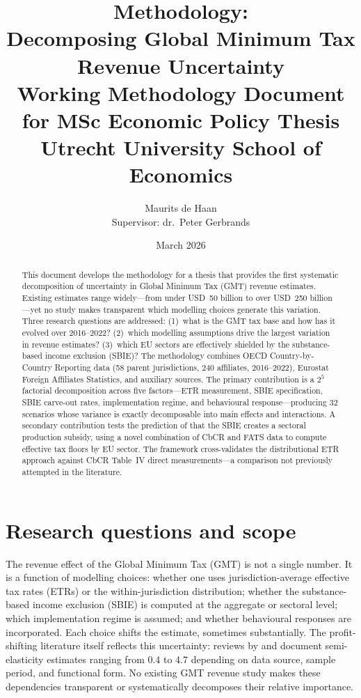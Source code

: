 \documentclass[11pt,a4paper]{article}
\title{\textbf{Methodology: \\ Decomposing Global Minimum Tax Revenue Uncertainty}\\[0.5em]
\large Working Methodology Document for MSc Economic Policy Thesis\\
Utrecht University School of Economics}
\author{Maurits de Haan\\[0.3em]
\small Supervisor: dr.\ Peter Gerbrands}
\date{March 2026}
\begin{document}
\maketitle

\begin{abstract}
\noindent
This document develops the methodology for a thesis that provides the first systematic decomposition of uncertainty in Global Minimum Tax (GMT) revenue estimates. Existing estimates range widely---from under USD~50 billion to over USD~250 billion---yet no study makes transparent which modelling choices generate this variation. Three research questions are addressed: (1)~what is the GMT tax base and how has it evolved over 2016--2022? (2)~which modelling assumptions drive the largest variation in revenue estimates? (3)~which EU sectors are effectively shielded by the substance-based income exclusion (SBIE)? The methodology combines OECD Country-by-Country Reporting data (58 parent jurisdictions, 240 affiliates, 2016--2022), Eurostat Foreign Affiliates Statistics, and auxiliary sources. The primary contribution is a $2^5$ factorial decomposition across five factors---ETR measurement, SBIE specification, SBIE carve-out rates, implementation regime, and behavioural response---producing 32 scenarios whose variance is exactly decomposable into main effects and interactions. A secondary contribution tests the prediction of \citet{schjelderup2024} that the SBIE creates a sectoral production subsidy, using a novel combination of CbCR and FATS data to compute effective tax floors by EU sector. The framework cross-validates the distributional ETR approach against CbCR Table~IV direct measurements---a comparison not previously attempted in the literature.
\end{abstract}

\newpage
\tableofcontents
\newpage

\section{Research questions and scope}\label{sec:rq}

The revenue effect of the Global Minimum Tax (GMT) is not a single number. It is a function of modelling choices: whether one uses jurisdiction-average effective tax rates (ETRs) or the within-jurisdiction distribution; whether the substance-based income exclusion (SBIE) is computed at the aggregate or sectoral level; which implementation regime is assumed; and whether behavioural responses are incorporated. Each choice shifts the estimate, sometimes substantially. The profit-shifting literature itself reflects this uncertainty: reviews by \citet{dharmapala2014} and \citet{riedel2018} document semi-elasticity estimates ranging from 0.4 to 4.7 depending on data source, sample period, and functional form. No existing GMT revenue study makes these dependencies transparent or systematically decomposes their relative importance.
\end{document}
